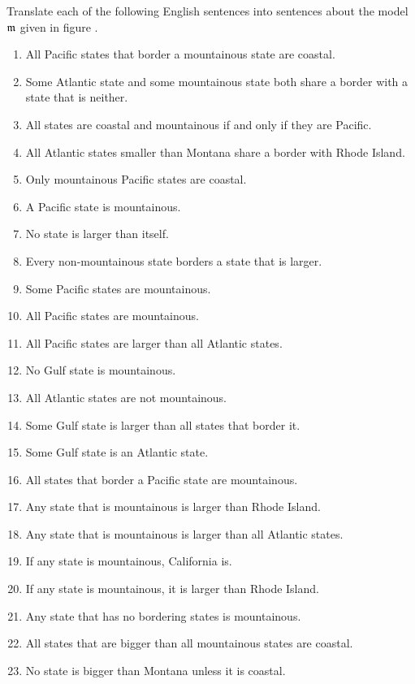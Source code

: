  Translate each of the following English sentences into \GQL{} sentences about the model $\mathfrak{m}$ given in figure .
\begin{multicols}{2}
	\begin{enumerate}
		\item {All Pacific states that border a mountainous state are coastal.}
		\item {Some Atlantic state and some mountainous state both share a border with a state that is neither.}
		\item {All states are coastal and mountainous if and only if they are Pacific.}
		\item {All Atlantic states smaller than Montana share a border with Rhode Island.}
		\item {Only mountainous Pacific states are coastal.}
		\item {A Pacific state is mountainous.}
		\item {No state is larger than itself.}
		\item {Every non-mountainous state borders a state that is larger.}
		\item {Some Pacific states are mountainous.}
		\item {All Pacific states are mountainous.}
		\item {All Pacific states are larger than all Atlantic states.}
		\item {No Gulf state is mountainous.}
		\item {All Atlantic states are not mountainous.}
		\item {Some Gulf state is larger than all states that border it.}
		\item {Some Gulf state is an Atlantic state.}
		\item {All states that border a Pacific state are mountainous.}
		\item {Any state that is mountainous is larger than Rhode Island.}
		\item {Any state that is mountainous is larger than all Atlantic
			states.}
		\item {If any state is mountainous, California is.}
		\item {If any state is mountainous, it is larger than Rhode Island.}
		\item {Any state that has no bordering states is mountainous.}
		\item {All states that are bigger than all mountainous states are
			coastal.}
		\item {No state is bigger than Montana unless it is coastal.}
	\end{enumerate}
\end{multicols}

